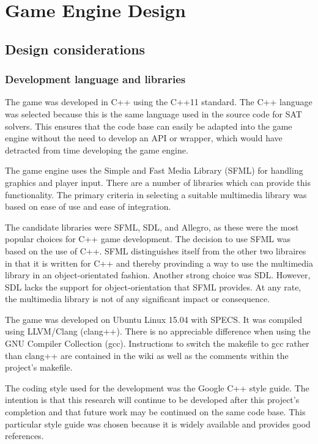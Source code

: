 \documentclass[11pt, a4paper, oneside]{report} %
\begin{document}

\chapter{Game Engine Design}

\section{Design considerations}

\subsection{Development language and libraries}

The game was developed in C++ using the C++11 standard. The C++ language was
selected because this is the same language used in the source code for SAT
solvers. This ensures that the code base can easily be adapted into the game
engine without the need to develop an API or wrapper, which would have detracted
from time developing the game engine.

The game engine uses the Simple and Fast Media Library (SFML) for handling
graphics and player input. There are a number of libraries which can provide this
functionality. The primary criteria in selecting a suitable multimedia library
was based on ease of use and ease of integration.

The candidate libraries were SFML, SDL, and Allegro, as these were the most
popular choices for C++ game development. The decision to use SFML was based on
the use of C++. SFML distinguishes itself from the other two libraires in that
it is written for C++ and thereby provinding a way to use the multimedia library
in an object-orientated fashion. Another strong choice was SDL. However, SDL
lacks the support for object-orientation that SFML provides. At any rate, the
multimedia library is not of any significant impact or consequence.

The game was developed on Ubuntu Linux 15.04 with SPECS. It was compiled using
LLVM/Clang (clang++). There is no appreciable difference when using the GNU
Compiler Collection (gcc). Instructions to switch the makefile to gcc rather
than clang++ are contained in the wiki as well as the comments within the
project's makefile.

The coding style used for the development was the Google C++ style guide. The
intention is that this research will continue to be developed after this
project's completion and  that future work may be continued on the same code
base. This particular style guide was chosen because it is widely available and
provides good references.
\end{document}
